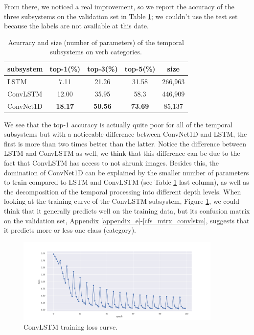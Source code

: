 \documentclass[12pt, a4paper]{report}
\begin{document}
			From there, we noticed a real improvement, so we report the accuracy of the three subsystems on the validation set in Table \ref{accuracy}; we couldn't use the test set because the labels are not available at this date.
			\begin{table}[h!]
				\centering
				\begin{tabular}{ l c c c c } 
					subsystem & top-1(\%)  & top-3(\%) & top-5(\%) & size\\
					\hline
					LSTM & 7.11 & 21.26 & 31.58 & 266,963 \\
					ConvLSTM & 12.00 & 35.95 & 58.3 & 446,909 \\
					ConvNet1D & \textbf{18.17} & \textbf{50.56} & \textbf{73.69} & 85,137 \\
				\end{tabular}
				\caption{Acurracy and size (number of parameters) of the temporal subsystems on verb categories.}
				\label{accuracy}
			\end{table}
			We see that the top-1 accuracy is actually quite poor for all of the temporal subsystems but with a noticeable difference between ConvNet1D and LSTM, the first is more than two times better than the latter.
			Notice the difference between LSTM and ConvLSTM as well, we think that this difference can be due to the fact that ConvLSTM has access to not shrunk images.
			Besides this, the domination of ConvNet1D can be explained by the smaller number of parameters to train compared to LSTM and ConvLSTM (see Table \ref{accuracy} last column), as well as the decomposition of the temporal processing into different depth levels.
			When looking at the training curve of the ConvLSTM subsystem, Figure \ref{convlstm_curve}, we could think that it generally predicts well on the training data, but its confusion matrix on the validation set, Appendix \ref{appendix_e}-\ref{cfs_mtrx_convlstm}, suggests that it predicts more or less one class (category).
			\begin{figure}[h!]
				\centering
				\includegraphics[width=0.9\textwidth]{curve.png}
				\caption{ConvLSTM training loss curve.\protect\footnotemark}
				\label{convlstm_curve}
			\end{figure}
\end{document}
